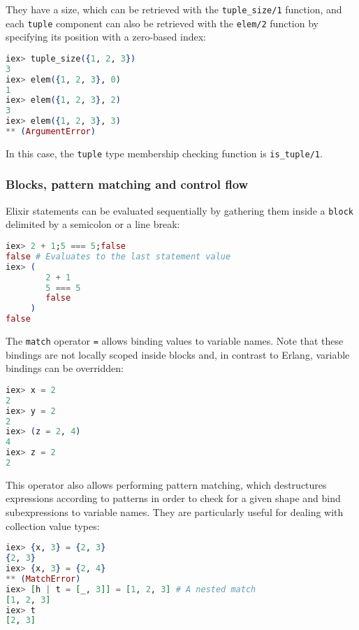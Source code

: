 They have a size, which can be retrieved with the \verb|tuple_size/1| function,
and each \verb|tuple| component can also be retrieved with the \verb|elem/2|
function by specifying its position with a zero-based index:

\begin{lstlisting}[language=elixir,numbers=none,frame=none]
iex> tuple_size({1, 2, 3})
3
iex> elem({1, 2, 3}, 0)
1
iex> elem({1, 2, 3}, 2)
3
iex> elem({1, 2, 3}, 3)
** (ArgumentError)
\end{lstlisting}

In this case, the \verb|tuple| type membership checking function is
\verb|is_tuple/1|.

\subsubsection{Blocks, pattern matching and control flow}

Elixir statements can be evaluated sequentially by gathering them inside a
\verb|block| delimited by a semicolon or a line break:

\begin{lstlisting}[language=elixir,numbers=none,frame=none]
iex> 2 + 1;5 === 5;false
false # Evaluates to the last statement value
iex> (
        2 + 1
        5 === 5
        false
     )
false
\end{lstlisting}

The \verb|match| operator \verb|=| allows binding values to variable names.
Note that these bindings are not locally scoped inside blocks and, in 
contrast to Erlang, variable bindings can be overridden:

\begin{lstlisting}[language=elixir,numbers=none,frame=none]
iex> x = 2
2
iex> y = 2
2
iex> (z = 2, 4)
4
iex> z = 2
2
\end{lstlisting}

This operator also allows performing pattern matching, which destructures 
expressions according to patterns in order to check for a given shape and 
bind subexpressions to variable names. They are particularly useful for 
dealing with collection value types:

\begin{lstlisting}[language=elixir,numbers=none,frame=none]
iex> {x, 3} = {2, 3}
{2, 3}
iex> {x, 3} = {2, 4}
** (MatchError)
iex> [h | t = [_, 3]] = [1, 2, 3] # A nested match
[1, 2, 3]
iex> t
[2, 3]
\end{lstlisting}

